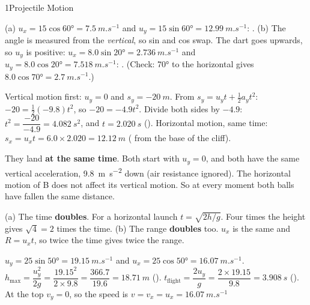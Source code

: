 \begin{chapteranswers}{1}{Projectile Motion}
  \item (a) $u_x = 15\cos\ang{60} = \qty{7.5}{m.s^{-1}}$ and
        $u_y = 15\sin\ang{60} = \qty{12.99}{m.s^{-1}}$:
        .
        (b) The angle is measured from the \emph{vertical}, so sin and cos swap. The dart goes
        upwards, so $u_y$ is positive:
        $u_x = 8.0\sin\ang{20} = \qty{2.736}{m.s^{-1}}$ and
        $u_y = 8.0\cos\ang{20} = \qty{7.518}{m.s^{-1}}$:
        .
        (Check: \ang{70} to the horizontal gives $8.0\cos\ang{70} = \qty{2.7}{m.s^{-1}}$.)
  \item Vertical motion first: $u_y = 0$ and $s_y = \qty{-20}{m}$. From
        $s_y = u_y t + \frac{1}{2}a_y t^2$: $-20 = \frac{1}{2}(-9.8)t^2$, so $-20 = -4.9t^2$.
        Divide both sides by $-4.9$: $t^2 = \dfrac{-20}{-4.9} = \qty{4.082}{s^2}$, and
        $t = \qty{2.020}{s}$ (). Horizontal motion, same time:
        $s_x = u_x t = 6.0 \times 2.020 = \qty{12.12}{m}$
        ( from the base of the cliff).
  \item They land \textbf{at the same time}. Both start with $u_y = 0$, and both have the
        same vertical acceleration, \qty{9.8}{m.s^{-2}} down (air resistance ignored). The
        horizontal motion of B does not affect its vertical motion. So at every moment both
        balls have fallen the same distance.
  \item (a) The time \textbf{doubles}. For a horizontal launch $t = \sqrt{2h/g}$. Four times
        the height gives $\sqrt{4} = 2$ times the time. (b) The range \textbf{doubles} too.
        $u_x$ is the same and $R = u_x t$, so twice the time gives twice the range.
  \item $u_y = 25\sin\ang{50} = \qty{19.15}{m.s^{-1}}$ and $u_x = 25\cos\ang{50} = \qty{16.07}{m.s^{-1}}$.
        $h_\mathrm{max} = \dfrac{u_y^2}{2g} = \dfrac{19.15^2}{2 \times 9.8} = \dfrac{366.7}{19.6}
        = \qty{18.71}{m}$ ().
        $t_\mathrm{flight} = \dfrac{2u_y}{g} = \dfrac{2 \times 19.15}{9.8} = \qty{3.908}{s}$
        ().
        At the top $v_y = 0$, so the speed is $v = v_x = u_x = \qty{16.07}{m.s^{-1}}$

\end{chapteranswers}
